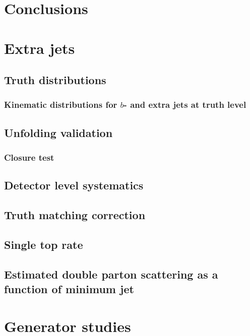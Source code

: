 \documentclass[12pt]{ucbthesis}
\begin{document}
\chapter{Conclusions}
\label{ch:conclusions}


\appendix
\chapter{Extra jets}
\section{Truth distributions}
\subsection{Kinematic distributions for $b$- and extra jets at truth level}
\label{app:truth}

\section{Unfolding validation}
\label{app:unfoldval}

\subsection{Closure test}
\label{app:unfoldpull}




\section{Detector level systematics}
\label{app:sys}


\section{Truth matching correction}
\label{app:tcorr}


\section{Single top rate}
\label{app:unfoldwt}


\section{Estimated double parton scattering as a function of minimum jet \pt}
\label{app:dps}

\chapter{Generator studies}
\label{app:evtgen}


\backmatter


\end{document}
